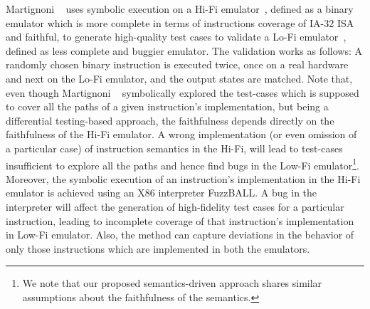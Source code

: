 Martignoni \etal~\cite{Martignoni:ASPLOS2012} uses symbolic execution on a
Hi-Fi emulator~\cite{Bochs1996}, defined  as a binary emulator which is more
complete in terms of instructions coverage of IA-32 ISA and faithful, to
generate high-quality test cases to validate  a Lo-Fi
emulator~\cite{QEMU:USENIX05}, defined as less complete and buggier emulator.
The validation works as follows: A randomly chosen binary instruction is
executed twice, once on a real hardware and next on the Lo-Fi emulator, and the
output states are matched.
%
Note that, even though Martignoni
\etal~\cite{Martignoni:ASPLOS2012} symbolically explored the test-cases which
is supposed to cover all the paths of a given instruction's implementation, but
being a differential testing-based approach, the faithfulness depends directly
on  the faithfulness of the Hi-Fi emulator. A wrong implementation (or even
    omission of a particular case) of instruction semantics in the Hi-Fi, will
lead to test-cases insufficient to explore all the paths and hence find bugs in
the Low-Fi emulator\footnote{We note that our proposed semantics-driven \tv approach shares similar assumptions about the faithfulness of the semantics.}. 
%
Moreover, the symbolic execution of an instruction's implementation in the
Hi-Fi emulator is achieved using an X86 interpreter FuzzBALL. A bug in the
interpreter will affect the generation of high-fidelity test cases for a particular
instruction, leading to incomplete coverage of that instruction's implementation
in Low-Fi emulator.
%
 Also, the method can capture  deviations in the behavior of only those
    instructions which are implemented in both the emulators.

